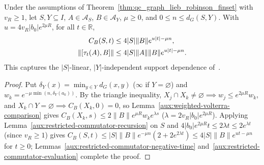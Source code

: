 \begin{lemma}
    \label{thm:qc_lr_finsets_numeric}
    \leanok
    Under the assumptions of Theorem~\ref{thm:qc_graph_lieb_robinson_finset} with $v_R\geq1$, let $S,Y\subseteq I$, $A\in\mathcal A_S$, $B\in\mathcal A_Y$, $\mu\geq0$, and $0\le n\leq d_G(S,Y)$. With $u=4v_R|b_0|e^{2\mu R}$, for all $t\in\mathbb R$,
    \begin{align}
        C_B(S,t)          & \leq4|S|\|B\|e^{u|t|-\mu n},\notag      \\
        \|[\tau_t(A),B]\| & \leq4|S|\|A\|\|B\|e^{u|t|-\mu n}.\notag
    \end{align}
    This captures the $|S|$-linear, $|Y|$-independent support dependence of~\cite[eq.~(1)]{Hastings2007AreaLaw}.
\end{lemma}
\begin{proof}\leanok
    Put $\delta_Y(x)=\min_{y\in Y}d_G(x,y)$ ($\infty$ if $Y=\varnothing$) and $w_k=e^{-\mu\min(n,\delta_Y(a_k))}$. By the triangle inequality, $X_j\cap X_k\ne\varnothing\implies w_j\le e^{2\mu R}w_k$, and $X_k\cap Y=\varnothing\implies C_B(X_k,0)=0$, so Lemma~\ref{aux:weighted-volterra-comparison} gives $C_B(X_k,s)\le 2\|B\|e^{\mu R}w_k e^{\lambda s}$ ($\lambda=2v_R|b_0|e^{2\mu R}$). Applying Lemma~\ref{aux:restricted-commutator-recursion} on $S$ and $4|b_0|e^{2\mu R}t\le 2\lambda t\le 2e^{\lambda t}$ (since $v_R\ge1$) gives $C_B(S,t)\le |S|\|B\|e^{-\mu n}(2+2e^{2\lambda t})\le 4|S|\|B\|e^{ut-\mu n}$ for $t\ge0$; Lemmas~\ref{aux:restricted-commutator-negative-time} and~\ref{aux:restricted-commutator-evaluation} complete the proof.
\end{proof}

